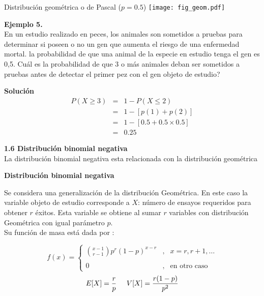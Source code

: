 \documentclass[base=hide,12pt]{elegantbook}
\begin{document}
\vspace{.5cm}

\begin{center}
	Distribución geométrica o de Pascal ($p=0.5$)
	\texttt{[image: fig\_geom.pdf]}
\end{center} 
\vspace{.5cm} 
\textcolor{col3}{\bf Ejemplo 5.} \\ 
En un estudio realizado en peces, los animales son sometidos a pruebas para determinar si poseen o no un gen que aumenta el riesgo de una enfermedad mortal. la probabilidad de que una animal de la especie en estudio tenga el gen es 0,5. Cuál es la probabilidad de que 3 o más animales deban ser sometidos a pruebas antes de detectar el primer pez con el gen objeto de estudio?

\textcolor{col3}{\bf \large Solución}\\
\begin{eqnarray*}
	P(X\geq 3)&=& 1-P(X\leq 2)\\
	&=& 1-[p(1)+p(2)] \\
	&=& 1-[0.5+0.5 \times 0.5] \\
	&=&0.25 
\end{eqnarray*}

\vspace{1cm}
\textcolor{col4}{\LARGE  \bf 1.6 Distribución binomial negativa }\\

La distribución binomial negativa esta relacionada con la distribución geométrica\\

\begin{Box2}{\bf Distribución binomial negativa}
	
	Se considera una generalización de la distribución Geométrica. En este caso la variable objeto de estudio corresponde a $X$: número de ensayos requeridos para obtener $r$ éxitos. Esta variable se obtiene al sumar $r$ variables con distribución Geométrica con igual parámetro $p$.\\
	
	Su función de masa está dada por :
	
	
	\begin{equation*}
		f(x)=\left\lbrace
		\begin{array}{lll}
			\displaystyle \binom{x-1}{r-1} p^{r} (1-p)^{x-r}	 &,& x= r, r+1,  \ldots    \\
			&&\\
			0 &,& \mbox{en otro caso}
		\end{array}
		\right.
	\end{equation*}
	$$E[X]=\dfrac{r}{p} \hspace{.5cm} V[X]=\dfrac{r(1-p)}{p^{2}}$$	
	
\end{Box2}
\end{document}
